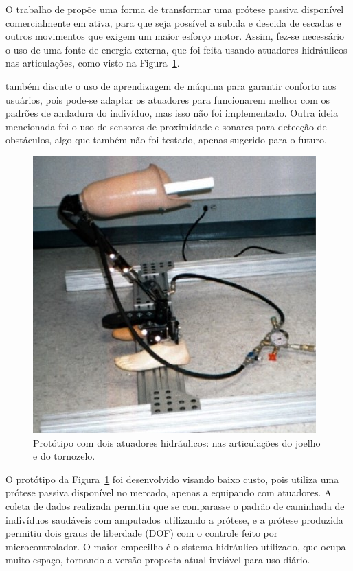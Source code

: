 O trabalho de  propõe uma forma de transformar uma prótese passiva disponível comercialmente em ativa, para que seja possível a subida e descida de escadas e outros movimentos que exigem um maior esforço motor. Assim, fez-se necessário o uso de uma fonte de energia externa, que foi feita usando atuadores hidráulicos nas articulações, como visto na Figura~\ref{fig:rel_smartleg_1}.

 também discute o uso de aprendizagem de máquina para garantir conforto aos usuários, pois pode-se adaptar os atuadores para funcionarem melhor com os padrões de andadura do indivíduo, mas isso não foi implementado. Outra ideia mencionada foi o uso de sensores de proximidade e sonares para detecção de obstáculos, algo que também não foi testado, apenas sugerido para o futuro.

\begin{figure}[ht]
	\caption{\label{fig:rel_smartleg_1}Protótipo com dois atuadores hidráulicos: nas articulações do joelho e do tornozelo.}
	\begin{center}
	    \includegraphics[width=.3\textwidth]{resources/rel_dedic_smart_leg_1}
	\end{center}
\end{figure}

O protótipo da Figura~\ref{fig:rel_smartleg_1} foi desenvolvido visando baixo custo, pois utiliza uma prótese passiva disponível no mercado, apenas a equipando com atuadores. A coleta de dados realizada permitiu que se comparasse o padrão de caminhada de indivíduos saudáveis com amputados utilizando a prótese, e a prótese produzida permitiu dois graus de liberdade (DOF) com o controle feito por microcontrolador. O maior empecilho é o sistema hidráulico utilizado, que ocupa muito espaço, tornando a versão proposta atual inviável para uso diário.


